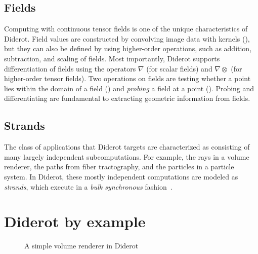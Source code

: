 \subsection{Fields}
Computing with continuous tensor fields is one of the unique characteristics of Diderot.
Field values are constructed by convolving image data with
kernels (), but they can also be defined
by using higher-order operations, such as addition, subtraction, and scaling of fields.
Most importantly, Diderot supports differentiation of fields using the operators $\nabla$
(for scalar fields) and $\nabla\otimes$ (for higher-order tensor fields).
Two operations on fields are testing whether a point  lies within the domain
of a field  () and \emph{probing} a field  at a point 
().
Probing and differentiating are fundamental to extracting geometric
information from fields.

\subsection{Strands}
The class of applications that Diderot targets are characterized as consisting of many
largely independent subcomputations.
For example, the rays in a volume renderer, the paths from fiber tractography, and
the particles in a particle system.
In Diderot, these mostly independent computations are modeled as \emph{strands}, which
execute in a \emph{bulk synchronous}
fashion~\cite{valiant:bridging-model-for-parallel,q-n-a-about-bsp}.


\section{Diderot by example}
\begin{figure}[p]
  \begin{quote}
    \lstset{language=Diderot}
    
  \end{quote}%
  \caption{A simple volume renderer in Diderot}
  \label{fig:vr-lite}
\end{figure}%
